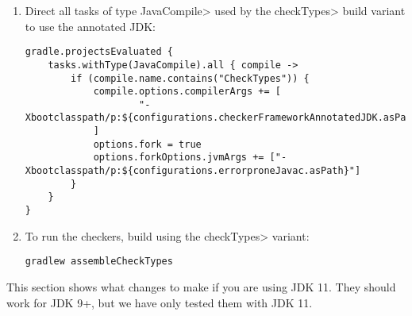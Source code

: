 \begin{enumerate}
\item Direct all tasks of type \<JavaCompile> used by the \<checkTypes> build variant to use the annotated JDK:
\begin{mysmall}
\begin{Verbatim}
gradle.projectsEvaluated {
    tasks.withType(JavaCompile).all { compile ->
        if (compile.name.contains("CheckTypes")) {
            compile.options.compilerArgs += [
                    "-Xbootclasspath/p:${configurations.checkerFrameworkAnnotatedJDK.asPath}"
            ]
            options.fork = true
            options.forkOptions.jvmArgs += ["-Xbootclasspath/p:${configurations.errorproneJavac.asPath}"]
        }
    }
}
\end{Verbatim}
\end{mysmall}

\item To run the checkers, build using the \<checkTypes> variant:
\begin{Verbatim}
gradlew assembleCheckTypes
\end{Verbatim}
\end{enumerate}

This section shows what changes to make if you are using JDK 11.  They should work for JDK 9+, but
we have only tested them with JDK 11.

